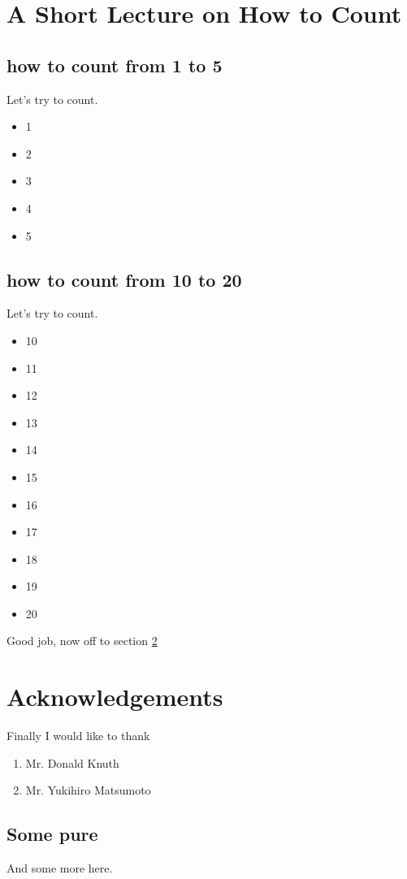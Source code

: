 \documentclass{article}
\begin{document}
\section{A Short Lecture on How to Count}
\subsection{how to count from 1 to 5}
Let's try to count.\begin{itemize}
\item{1}
\item{2}
\item{3}
\item{4}
\item{5}
\end{itemize}
\subsection{how to count from 10 to 20}
Let's try to count.\begin{itemize}
\item{10}
\item{11}
\item{12}
\item{13}
\item{14}
\item{15}
\item{16}
\item{17}
\item{18}
\item{19}
\item{20}
\end{itemize}
Good job, now off to section \ref{acks}

\section{Acknowledgements}
\label{acks}
Finally I would like to thank 
\begin{enumerate}
\item{Mr. Donald Knuth}
\item{Mr. Yukihiro Matsumoto}
\end{enumerate}
 \subsection{Some pure \latex}
  
  And some more here.
  
  
\end{document}
